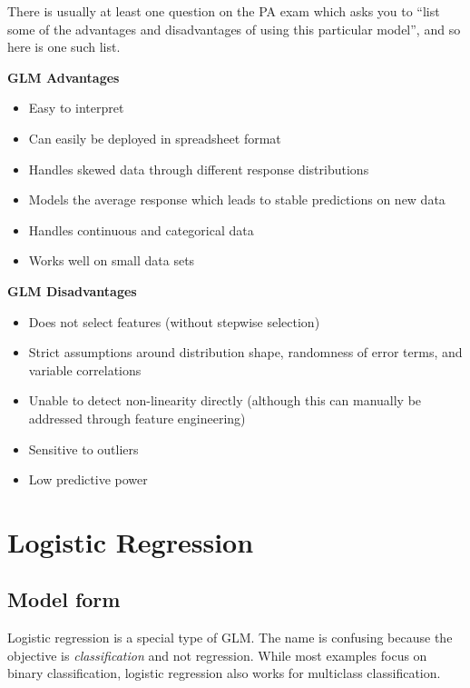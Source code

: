 \documentclass[]{book}
\providecommand{\tightlist}{%
  \setlength{\itemsep}{0pt}\setlength{\parskip}{0pt}}
\begin{document}
There is usually at least one question on the PA exam which asks you to ``list some of the advantages and disadvantages of using this particular model'', and so here is one such list.

\textbf{GLM Advantages}

\begin{itemize}
\tightlist
\item
  Easy to interpret
\item
  Can easily be deployed in spreadsheet format
\item
  Handles skewed data through different response distributions
\item
  Models the average response which leads to stable predictions on new data
\item
  Handles continuous and categorical data
\item
  Works well on small data sets
\end{itemize}

\textbf{GLM Disadvantages}

\begin{itemize}
\tightlist
\item
  Does not select features (without stepwise selection)
\item
  Strict assumptions around distribution shape, randomness of error terms, and variable correlations
\item
  Unable to detect non-linearity directly (although this can manually be addressed through feature engineering)
\item
  Sensitive to outliers
\item
  Low predictive power
\end{itemize}

\hypertarget{logistic-regression}{%
\chapter{Logistic Regression}\label{logistic-regression}}

\hypertarget{model-form-1}{%
\section{Model form}\label{model-form-1}}

Logistic regression is a special type of GLM. The name is confusing because the objective is \emph{classification} and not regression. While most examples focus on binary classification, logistic regression also works for multiclass classification.
\end{document}
